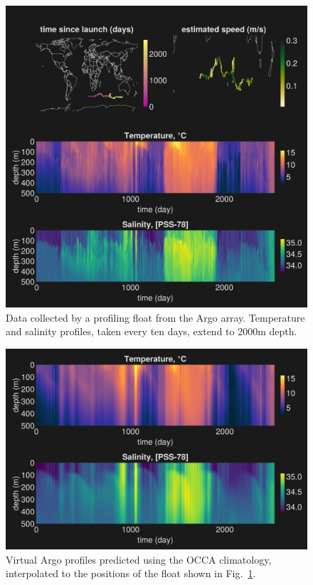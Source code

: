 \documentclass{juliacon}[12pt]
\begin{document}
\begin{figure}[t]
\centerline{\includegraphics[width=\columnwidth]{figs/20240528_Argo_6900900.png}}
\caption{Data collected by a profiling float from the Argo array. Temperature and salinity profiles, taken every ten days, extend to 2000m depth.}
\label{fig:Argo_Float}
\end{figure}

\begin{figure}[t]
\centerline{\includegraphics[width=\columnwidth]{figs/20240529_MITprof_OCCA.png}}
\caption{Virtual Argo profiles predicted using the OCCA climatology, interpolated to the positions of the float shown in Fig.~\ref{fig:Argo_Float}.}
\label{fig:Argo_Float_simu}
\end{figure}
\end{document}

